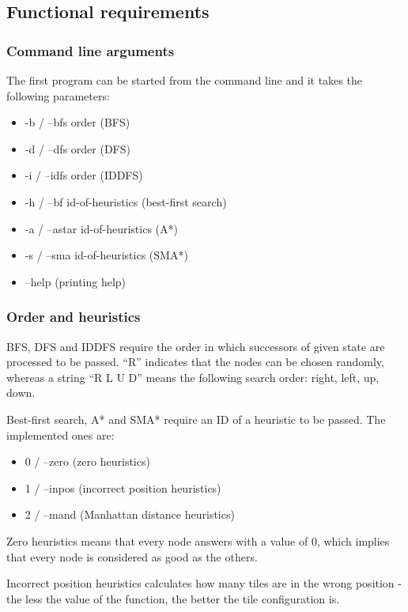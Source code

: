 \documentclass[12pt]{article}
\begin{document}
\subsection{Functional requirements}
\subsubsection{Command line arguments}

The first program can be started from the command line and it takes the following parameters:

\begin{itemize}
    \item -b / --bfs order (BFS)
    \item -d / --dfs order (DFS)
    \item -i / --idfs order (IDDFS)
    \item -h / --bf id-of-heuristics (best-first search)
    \item -a / --astar id-of-heuristics (A*)
    \item -s / --sma id-of-heuristics (SMA*)
    \item --help (printing help)
\end{itemize}

\subsubsection{Order and heuristics}

BFS, DFS and IDDFS require the order in which successors of given state are processed to be passed. ``R'' indicates that the nodes can be chosen randomly, whereas a string ``R L U D'' means the following search order: right, left, up, down.

Best-first search, A* and SMA* require an ID of a heuristic to be passed. The implemented ones are:

\begin{itemize}
    \item 0 / --zero (zero heuristics)
    \item  1 / --inpos (incorrect position heuristics)
    \item 2 / --mand (Manhattan distance heuristics)
\end{itemize}

Zero heuristics means that every node answers with a value of 0, which implies that every node is considered as good as the others.

Incorrect position heuristics calculates how many tiles are in the wrong position - the less the value of the function, the better the tile configuration is.
\end{document}
